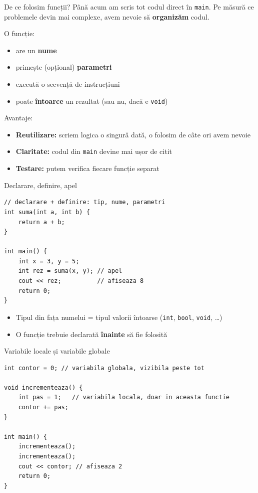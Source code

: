\documentclass{beamer}
\begin{document}
\begin{frame}[shrink]{De ce folosim funcții?}
  Până acum am scris tot codul direct în \texttt{main}. Pe măsură ce problemele devin mai complexe, avem nevoie să \textbf{organizăm} codul.

  \begin{block}{O funcție:}
    \begin{itemize}
      \item are un \textbf{nume}
      \item primește (opțional) \textbf{parametri}
      \item execută o secvență de instrucțiuni
      \item poate \textbf{întoarce} un rezultat (sau nu, dacă e \texttt{void})
    \end{itemize}
  \end{block}

  \smallskip
  \begin{block}{Avantaje:}
    \begin{itemize}
      \item \textbf{Reutilizare:} scriem logica o singură dată, o folosim de câte ori avem nevoie
      \item \textbf{Claritate:} codul din \texttt{main} devine mai ușor de citit
      \item \textbf{Testare:} putem verifica fiecare funcție separat
    \end{itemize}
  \end{block}
\end{frame}

\begin{frame}[fragile]{Declarare, definire, apel}
  \begin{lstlisting}
// declarare + definire: tip, nume, parametri
int suma(int a, int b) {
    return a + b;
}

int main() {
    int x = 3, y = 5;
    int rez = suma(x, y); // apel
    cout << rez;          // afiseaza 8
    return 0;
}
  \end{lstlisting}
  \begin{itemize}
    \item Tipul din fața numelui = tipul valorii întoarse (\texttt{int}, \texttt{bool}, \texttt{void}, \dots)
    \item O funcție trebuie declarată \textbf{înainte} să fie folosită
  \end{itemize}
\end{frame}

\begin{frame}[fragile]{Variabile locale și variabile globale}
  \begin{lstlisting}
int contor = 0; // variabila globala, vizibila peste tot

void incrementeaza() {
    int pas = 1;   // variabila locala, doar in aceasta functie
    contor += pas;
}

int main() {
    incrementeaza();
    incrementeaza();
    cout << contor; // afiseaza 2
    return 0;
}
  \end{lstlisting}
\end{frame}
\end{document}
